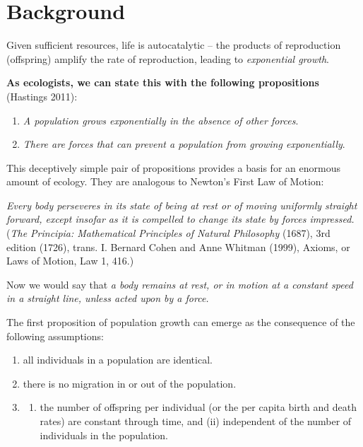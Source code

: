 \documentclass[
  letterpaper,
  DIV=11,
  numbers=noendperiod]{scrreprt}
\providecommand{\tightlist}{%
  \setlength{\itemsep}{0pt}\setlength{\parskip}{0pt}}
\begin{document}
\section{Background}\label{background-5}

Given sufficient resources, life is autocatalytic -- the products of
reproduction (offspring) amplify the rate of reproduction, leading to
\emph{exponential growth}.

\textbf{As ecologists, we can state this with the following
propositions} (Hastings 2011):

\begin{enumerate}
\def\labelenumi{\arabic{enumi}.}
\tightlist
\item
  \emph{A population grows exponentially in the absence of other
  forces}.
\item
  \emph{There are forces that can prevent a population from growing
  exponentially}.
\end{enumerate}

This deceptively simple pair of propositions provides a basis for an
enormous amount of ecology. They are analogous to Newton's First Law of
Motion:

\emph{Every body perseveres in its state of being at rest or of moving
uniformly straight forward, except insofar as it is compelled to change
its state by forces impressed.} (\emph{The Principia: Mathematical
Principles of Natural Philosophy} (1687), 3rd edition (1726), trans. I.
Bernard Cohen and Anne Whitman (1999), Axioms, or Laws of Motion, Law 1,
416.)

Now we would say that \emph{a body remains at rest, or in motion at a
constant speed in a straight line, unless acted upon by a force.}

The first proposition of population growth can emerge as the consequence
of the following assumptions:

\begin{enumerate}
\def\labelenumi{\alph{enumi}.}
\tightlist
\item
  all individuals in a population are identical.
\item
  there is no migration in or out of the population.
\item
  \begin{enumerate}
  \def\labelenumii{\roman{enumii}.}
  \tightlist
  \item
    the number of offspring per individual (or the per capita birth and
    death rates) are constant through time, and (ii) independent of the
    number of individuals in the population.
  \end{enumerate}
\end{enumerate}
\end{document}

